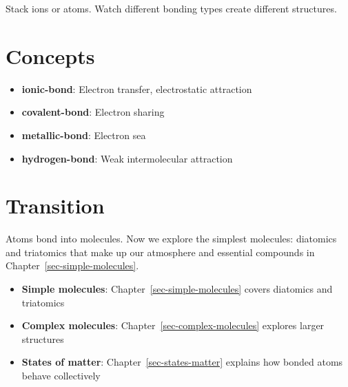 \documentclass[
  11pt,
  letterpaper,
  twoside,
  openright]{book}
\providecommand{\tightlist}{%
  \setlength{\itemsep}{0pt}\setlength{\parskip}{0pt}}
\begin{document}
Stack ions or atoms. Watch different bonding types create different
structures.

\section{Concepts}\label{concepts-4}

\begin{itemize}
\tightlist
\item
  \textbf{ionic-bond}: Electron transfer, electrostatic attraction
\item
  \textbf{covalent-bond}: Electron sharing
\item
  \textbf{metallic-bond}: Electron sea
\item
  \textbf{hydrogen-bond}: Weak intermolecular attraction
\end{itemize}

\section{Transition}\label{transition-4}

Atoms bond into molecules. Now we explore the simplest molecules:
diatomics and triatomics that make up our atmosphere and essential
compounds in Chapter~\ref{sec-simple-molecules}.

\begin{tcolorbox}[enhanced jigsaw, coltitle=black, colbacktitle=quarto-callout-tip-color!10!white, toprule=.15mm, colframe=quarto-callout-tip-color-frame, arc=.35mm, opacityback=0, bottomtitle=1mm, toptitle=1mm, breakable, colback=white, titlerule=0mm, opacitybacktitle=0.6, title=\textcolor{quarto-callout-tip-color}{\faLightbulb}\hspace{0.5em}{Related Topics}, rightrule=.15mm, bottomrule=.15mm, leftrule=.75mm, left=2mm]

\begin{itemize}
\tightlist
\item
  \textbf{Simple molecules}: Chapter~\ref{sec-simple-molecules} covers
  diatomics and triatomics
\item
  \textbf{Complex molecules}: Chapter~\ref{sec-complex-molecules}
  explores larger structures
\item
  \textbf{States of matter}: Chapter~\ref{sec-states-matter} explains
  how bonded atoms behave collectively
\end{itemize}

\end{tcolorbox}
\end{document}
